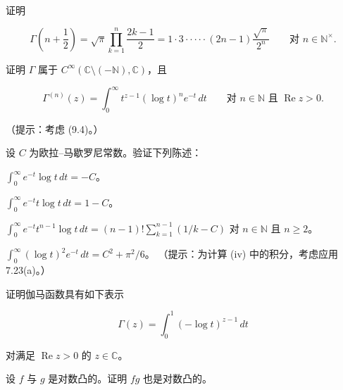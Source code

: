 \begin{exercises}
\item

证明

\[
\Gamma\left(n + \frac{1}{2}\right) = \sqrt{\pi}\prod_{k=1}^{n}\frac{2k-1}{2} = 1 \cdot 3 \cdot \cdot \cdot \cdot \cdot (2n-1)\frac{\sqrt{\pi}}{2^{n}} \qquad \text{对 } n \in \mathbb{N}^{\times} .
\]
\item

证明 $ \Gamma $ 属于 $ C^{\infty}(\mathbb{C}\setminus(-\mathbb{N}),\mathbb{C}) $，且

\[
\Gamma^{(n)}(z) = \int_{0}^{\infty} t^{z-1}(\log t)^{n}e^{-t} \, dt \qquad \text{对 } n \in \mathbb{N} \text{ 且 } \operatorname{Re} z > 0 .
\]

（提示：考虑 (9.4)。）

\item

设 $ C $ 为欧拉–马歇罗尼常数。验证下列陈述：

\begin{subitems}
\item

$ \int_{0}^{\infty} e^{-t}\log t \, dt = -C $。

\item

$ \int_{0}^{\infty} e^{-t}t\log t \, dt = 1 - C $。

\item

$ \int_{0}^{\infty} e^{-t}t^{n-1}\log t \, dt = (n-1)!\sum_{k=1}^{n-1}(1/k - C) $ 对 $ n \in \mathbb{N} $ 且 $ n \ge 2 $。

\item

$ \int_{0}^{\infty}(\log t)^{2}e^{-t} \, dt = C^{2} + \pi^{2}/6 $。
（提示：为计算 (iv) 中的积分，考虑应用 7.23(a)。）

\end{subitems}

\item

证明伽马函数具有如下表示

\[
\Gamma(z) = \int_{0}^{1}(-\log t)^{z-1} \, dt
\]

对满足 $ \operatorname{Re} z > 0 $ 的 $ z \in \mathbb{C} $。

\item

设 $ f $ 与 $ g $ 是对数凸的。证明 $ fg $ 也是对数凸的。

\item


\end{exercises}
